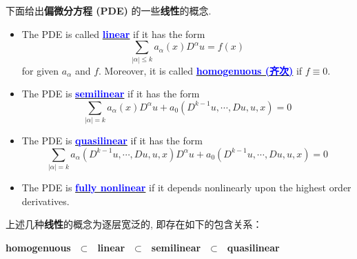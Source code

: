 	\vspace{6em}	
	
	下面给出\textbf{偏微分方程 (PDE)} 的一些\textbf{线性}的概念.
	\begin{defn}\label{def 1.1.2}
		\begin{itemize}
			\item The PDE is called \underline{\textcolor{blue}{\textbf{linear}}} if it has the form
			\[ \sum_{\left| \alpha \right| \leq k} a_{\alpha}(x) D^{\alpha}u = f(x) \]
			for given $a_\alpha$ and $f$. Moreover, it is called \underline{\textcolor{blue}{\textbf{homogenuous (齐次)}}} if $f \equiv 0$.
			
			\vspace{2em}
			
			\item The PDE is \underline{\textcolor{blue}{\textbf{semilinear}}} if it has the form
			\[ \sum_{\left| \alpha \right| = k} a_{\alpha}(x) D^{\alpha}u + a_0(D^{k - 1}u , \cdots , Du , u , x) = 0 \]
			
			\vspace*{2em}
			
			\item The PDE is \underline{\textcolor{blue}{\textbf{quasilinear}}} if it has the form
			\[ \sum_{\left| \alpha \right| = k} a_{\alpha}(D^{k - 1}u , \cdots , Du , u , x) D^{\alpha}u + a_0(D^{k - 1}u , \cdots , Du , u , x) = 0 \]
			
			\vspace*{2em}
			
			\item The PDE is \underline{\textcolor{blue}{\textbf{fully nonlinear}}} if it depends nonlinearly upon the highest order derivatives.
		\end{itemize}
		
		\vspace{2em}
		
		\begin{rmk}
			上述几种\textbf{线性}的概念为逐层宽泛的, 即存在如下的包含关系：
			\begin{center}
				\textbf{homogenuous $\,\, \subset \,\,$ linear $\,\, \subset \,\,$ semilinear $\,\, \subset \,\,$ quasilinear}
			\end{center}
		\end{rmk}
	\end{defn}

	\vspace{6em}
	
